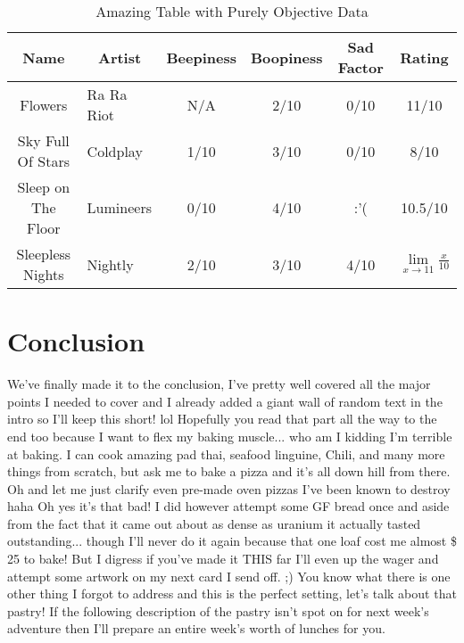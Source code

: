 \documentclass[]{article}
\begin{document}
\begin{table}[htb]
\centering
\caption{Amazing Table with Purely Objective Data}
\begin{tabular}{|c|l|cccc|}
\hline
\textbf{Name}               & \multicolumn{1}{c|}{\textbf{Artist}} & \textbf{Beepiness} &  \textbf{Boopiness} & \textbf{Sad Factor} & \textbf{Rating}  \\ \hline
Flowers            & Ra Ra Riot                  & N/A       & 2/10      & 0/10       & 11/10   \\
Sky Full Of Stars  & Coldplay                    & 1/10      & 3/10      & 0/10       & 8/10    \\
Sleep on The Floor & Lumineers                   & 0/10      & 4/10      & :'(        & 10.5/10 \\
Sleepless Nights   & Nightly                     & 2/10      & 3/10      & 4/10       & $\lim\limits_{x \rightarrow 11} \frac{x}{10}$     \\ \hline
\end{tabular}
\end{table}



\section{Conclusion}
We've finally made it to the conclusion, I've pretty well covered all the major points I needed to cover and I already added a giant wall of random text in the intro so I'll keep this short! lol Hopefully you read that part all the way to the end too because I want to flex my baking muscle... who am I kidding I'm terrible at baking. I can cook amazing pad thai, seafood linguine, Chili, and many more things from scratch, but ask me to bake a pizza and it's all down hill from there. Oh and let me just clarify even pre-made oven pizzas I've been known to destroy haha Oh yes it's that bad! I did however attempt some GF bread once and aside from the fact that it came out about as dense as uranium it actually tasted outstanding... though I'll never do it again because that one loaf cost me almost \$ 25 to bake! But I digress if you've made it THIS far I'll even up the wager and attempt some artwork on my next card I send off. ;) You know what there is one other thing I forgot to address and this is the perfect setting, let's talk about that pastry! If the following description of the pastry isn't spot on for next week's adventure then I'll prepare an entire week's worth of lunches for you.
\end{document}
